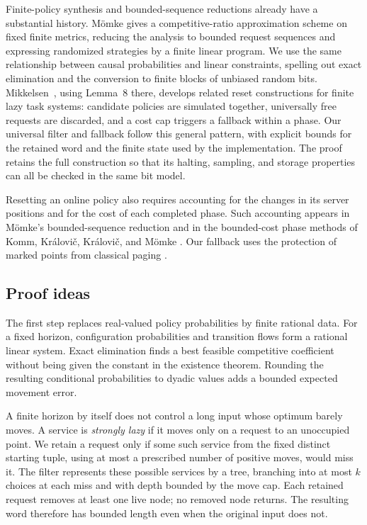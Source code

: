 Finite-policy synthesis and bounded-sequence reductions already have a
substantial history. M\"omke \cite[Sections~3--4]{Moemke2013} gives a
competitive-ratio approximation scheme on fixed finite metrics, reducing
the analysis to bounded request sequences and expressing randomized
strategies by a finite linear program. We use the same relationship between
causal probabilities and linear constraints, spelling out exact
elimination and the conversion to finite blocks of unbiased random bits.
Mikkelsen~\cite[Section~5.2, proof of Lemma~9]{Mikkelsen2016}, using
Lemma~8 there, develops related
reset constructions for finite lazy task systems: candidate policies are
simulated together, universally free requests are discarded, and a cost cap
triggers a fallback within a phase. Our universal filter and fallback
follow this general pattern, with explicit bounds for the retained word
and the finite state used by the implementation.
The proof retains the full construction so that its halting, sampling,
and storage properties can all be checked in the same bit model.

Resetting an online policy also requires accounting for the changes in its
server positions and for the cost of each completed phase. Such accounting
appears in M\"omke's bounded-sequence reduction
\cite[Section~3]{Moemke2013} and in the bounded-cost phase methods of
Komm, Kr\'alovi\v c, Kr\'alovi\v c, and M\"omke
\cite[Section~4]{KKKM2022}. Our fallback uses the protection of marked
points from classical paging \cite[Section~3]{FKLMSY1991}.

\subsection{Proof ideas}

The first step replaces real-valued policy probabilities by finite rational
data. For a fixed horizon, configuration probabilities and transition flows
form a rational linear system. Exact elimination finds a best feasible
competitive coefficient without being given the constant in the existence
theorem. Rounding the resulting conditional probabilities to dyadic values
adds a bounded expected movement error.

A finite horizon by itself does not control a long input whose optimum barely
moves. A service is \emph{strongly lazy} if it moves only on a request to an
unoccupied point. We retain a request only if some such service from the
fixed distinct starting tuple, using at most a prescribed number of positive
moves, would miss it. The filter represents these possible services by a
tree, branching into at most \(k\) choices at each miss and with depth
bounded by the move cap. Each retained request removes at least one live
node; no removed node returns. The resulting word therefore has bounded
length even when the original input does not.

